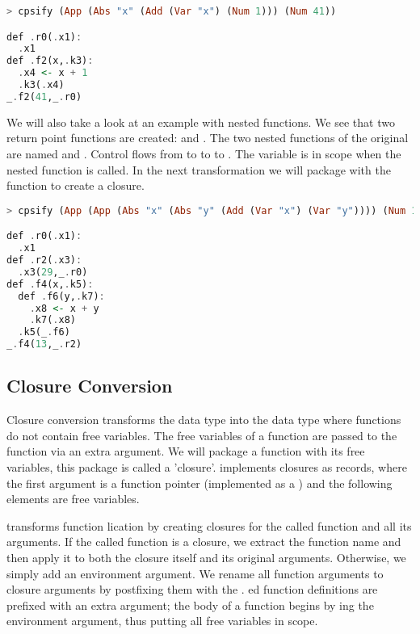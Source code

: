 {\begin{lstlisting}[language=Haskell]
> cpsify (App (Abs "x" (Add (Var "x") (Num 1))) (Num 41))

def .r0(.x1):
  .x1
def .f2(x,.k3):
  .x4 <- x + 1
  .k3(.x4)
_.f2(41,_.r0)
\end{lstlisting}

We will also take a look at an example with nested functions. We see that two return point functions are created:  and . The two nested functions of the original  are named  and . Control flows from  to  to  to . The variable  is in scope when the nested function  is called. In the next transformation we will package  with the function  to create a closure.

\begin{lstlisting}[language=Haskell]
> cpsify (App (App (Abs "x" (Abs "y" (Add (Var "x") (Var "y")))) (Num 13)) (Num 29))

def .r0(.x1):
  .x1
def .r2(.x3):
  .x3(29,_.r0)
def .f4(x,.k5):
  def .f6(y,.k7):
    .x8 <- x + y
    .k7(.x8)
  .k5(_.f6)
_.f4(13,_.r2)
\end{lstlisting}

\subsection{\label{section:closconvert}Closure Conversion}
Closure conversion transforms the  data type into the  data type where functions do not contain free variables. The free variables of a function are passed to the function via an extra argument. We will package a function with its free variables, this package is called a 'closure'.  implements closures as records, where the first argument is a function pointer (implemented as a ) and the following elements are free variables.

 transforms function lication by creating closures for the called function and all its arguments. If the called function is a closure, we extract the function name and then apply it to both the closure itself and its original arguments. Otherwise, we simply add an environment argument. We rename all function arguments to closure arguments by postfixing them with the . ed function definitions are prefixed with an extra  argument; the body of a function begins by ing the environment argument, thus putting all free variables in scope.

}
